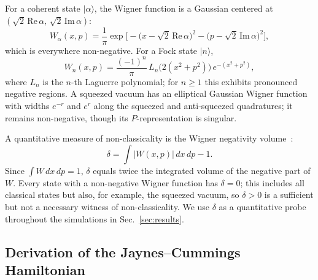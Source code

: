 \documentclass[12pt]{iopart}
\begin{document}
For a coherent state $|\alpha\rangle$, the Wigner function is a Gaussian centered at $(\sqrt{2}\,\text{Re}\,\alpha,\, \sqrt{2}\,\text{Im}\,\alpha)$:
\begin{equation}
W_\alpha(x,p) = \frac{1}{\pi} \exp\!\Big[-\big(x - \sqrt{2}\,\text{Re}\,\alpha\big)^2 - \big(p - \sqrt{2}\,\text{Im}\,\alpha\big)^2\Big],
\label{eq:wigner_coherent}
\end{equation}
which is everywhere non-negative. For a Fock state $|n\rangle$,
\begin{equation}
W_n(x,p) = \frac{(-1)^n}{\pi} \, L_n\!\big(2(x^2 + p^2)\big) \, e^{-(x^2 + p^2)},
\label{eq:wigner_fock}
\end{equation}
where $L_n$ is the $n$-th Laguerre polynomial; for $n \geq 1$ this exhibits pronounced negative regions. A squeezed vacuum has an elliptical Gaussian Wigner function with widths $e^{-r}$ and $e^{r}$ along the squeezed and anti-squeezed quadratures; it remains non-negative, though its $P$-representation is singular.

A quantitative measure of non-classicality is the Wigner negativity volume~\cite{kenfack2004}:
\begin{equation}
\delta = \int \big|W(x,p)\big| \, dx\, dp - 1.
\label{eq:negativity}
\end{equation}
Since $\int W\,dx\,dp = 1$, $\delta$ equals twice the integrated volume of the negative part of $W$. Every state with a non-negative Wigner function has $\delta = 0$; this includes all classical states but also, for example, the squeezed vacuum, so $\delta > 0$ is a sufficient but not a necessary witness of non-classicality. We use $\delta$ as a quantitative probe throughout the simulations in Sec.~\ref{sec:results}.


\subsection{Derivation of the Jaynes--Cummings Hamiltonian}
\label{sec:jcm}
\end{document}
